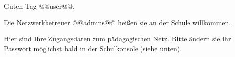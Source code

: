 Guten Tag @@user@@,

\vspace{2mm}

Die Netzwerkbetreuer @@admins@@ heißen sie an der Schule willkommen.

\vspace{2mm}

Hier sind Ihre Zugangsdaten zum pädagogischen Netz. Bitte ändern sie ihr Passwort möglichst bald in der Schulkonsole (siehe unten). 



